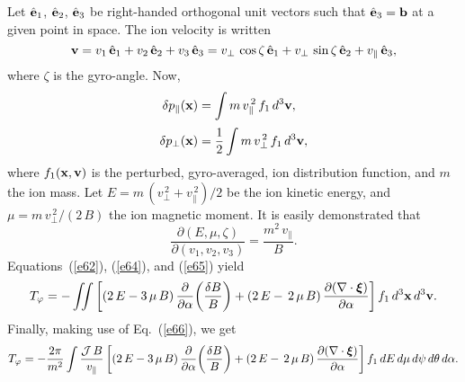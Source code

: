 \documentclass[12pt,prb,aps,notitlepage]{revtex4-1}
\newcommand{\bxi}{\mbox{\boldmath$\xi$}}
\begin{document}
 Let $\hat{\bf e}_1$, $\hat{\bf e}_2$, $\hat{\bf e}_3$ be right-handed orthogonal unit vectors such that $\hat{\bf e}_3={\bf b}$ at a given
 point in space. The ion velocity is written
 \begin{equation}
 {\bf v} = v_1\,\hat{\bf e}_1 + v_2\,\hat{\bf e}_2+v_3\,\hat{\bf e}_3= v_\perp\,\cos\zeta\,\hat{\bf e}_1+ v_\perp\,\sin\zeta\,\hat{\bf e}_2+ 
 v_\parallel\,\hat{\bf e}_3,
 \end{equation}
 where $\zeta$ is the gyro-angle. 
 Now, 
 \begin{align}\label{e64}
 \delta p_\parallel({\bf x}) &= \int m\,v_\parallel^{\,2}\,f_1\,d^3{\bf v},\\[0.5ex]
 \delta p_\perp({\bf x}) &= \frac{1}{2}\int m\,v_\perp^{\,2}\,f_1\,d^3{\bf v},\label{e65}
 \end{align}
 where $f_1({\bf x},{\bf v})$ is the perturbed, gyro-averaged, ion distribution function, and $m$  the ion mass. Let
 $E=m\,(v_\perp^{\,2}+v_\parallel^{\,2})/2$ be the ion kinetic energy,  and $\mu=m\,v_\perp^{\,2}/(2\,B)$ the ion magnetic moment. 
 It is easily demonstrated that
 \begin{equation}\label{e66}
 \frac{\partial (E,\mu,\zeta)}{\partial(v_1,v_2,v_3)} = \frac{m^2\,v_\parallel}{B}.
 \end{equation}
 Equations~(\ref{e62}), (\ref{e64}), and (\ref{e65}) yield
 \begin{equation}
 T_\varphi =-\int\!\!\!\int \left[(2\,E-3\,\mu\,B)\,\frac{\partial}{\partial\alpha}\!\left(\frac{\delta B}{B}\right) + (2\,E-\,2\,\mu\,B)\,\frac{\partial(\nabla\cdot\bxi)}{\partial\alpha}\right]f_1\,d^3{\bf x}\,d^3{\bf v}.
 \end{equation}
 Finally, making use of Eq.~(\ref{e66}), we get
 \begin{equation}
 T_\varphi = -\frac{2\pi}{m^2}\int \frac{{\cal J}\,B}{v_\parallel}\left[(2\,E-3\,\mu\,B)\,\frac{\partial}{\partial\alpha}\!\left(\frac{\delta B}{B}\right) + (2\,E-\,2\,\mu\,B)\,\frac{\partial(\nabla\cdot\bxi)}{\partial\alpha}\right]f_1\,dE\,d\mu\,d\psi\,d\theta\,d\alpha.
 \end{equation}
 
\end{document}
